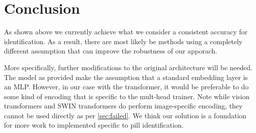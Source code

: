 \documentclass[10pt,twocolumn,letterpaper]{article}
\begin{document}
\section{Conclusion}

As shown above we currently achieve what we consider a consistent accuracy for identification. As a result, there are most likely be methods using a completely different assumption that 
can improve the robustness of our apporach.  \par

More specifically, further modifications to the original architecture will be needed. The model as provided make the assumption that a standard embedding layer is an MLP. However, in our case with the transformer, it would be preferable to do some kind of encoding that is specific to the mult-head trainer. Note while vision transformers and SWIN transformers do perform image-specific encoding, they cannot be used directly as per \ref{sec:failed}. We think our solution is a foundation for more work to implemented specific to pill identification.

 \par



{\small


}

\newpage
\end{document}
